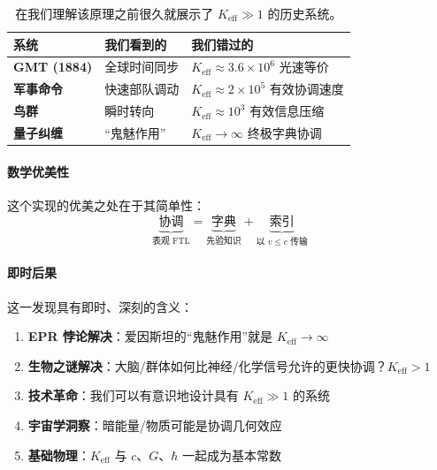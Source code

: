 \documentclass[11pt,a4paper]{article}
\begin{document}
	\begin{table}[htbp]
		\centering
		\begin{tabular}{p{}p{}p{}}
			\toprule
			\textbf{系统} & \textbf{我们看到的} & \textbf{我们错过的} \\
			\midrule
			\textbf{GMT (1884)} & 全球时间同步 & $K_{\mathrm{eff}} \approx 3.6\times10^6$ 光速等价 \\
			\textbf{军事命令} & 快速部队调动 & $K_{\mathrm{eff}} \approx 2\times10^5$ 有效协调速度 \\
			\textbf{鸟群} & 瞬时转向 & $K_{\mathrm{eff}} \approx 10^3$ 有效信息压缩 \\
			\textbf{量子纠缠} & “鬼魅作用” & $K_{\mathrm{eff}} \to \infty$ 终极字典协调 \\
			\bottomrule
		\end{tabular}
		\caption{在我们理解该原理之前很久就展示了 $K_{\mathrm{eff}} \gg 1$ 的历史系统。}
	\end{table}
	
	\paragraph{数学优美性}
	这个实现的优美之处在于其简单性：
	\begin{equation}
		\underbrace{\text{协调}}_{\text{表观 FTL}} = 
		\underbrace{\text{字典}}_{\text{先验知识}} + 
		\underbrace{\text{索引}}_{\text{以 } v \leq c \text{ 传输}}
	\end{equation}
	
	\paragraph{即时后果}
	这一发现具有即时、深刻的含义：
	
	\begin{enumerate}
		\item \textbf{EPR 悖论解决}：爱因斯坦的“鬼魅作用”就是 $K_{\mathrm{eff}} \to \infty$
		
		\item \textbf{生物之谜解决}：大脑/群体如何比神经/化学信号允许的更快协调？$K_{\mathrm{eff}} > 1$
		
		\item \textbf{技术革命}：我们可以有意识地设计具有 $K_{\mathrm{eff}} \gg 1$ 的系统
		
		\item \textbf{宇宙学洞察}：暗能量/物质可能是协调几何效应
		
		\item \textbf{基础物理}：$K_{\mathrm{eff}}$ 与 $c$、$G$、$\hbar$ 一起成为基本常数
	\end{enumerate}
	
\end{document}

